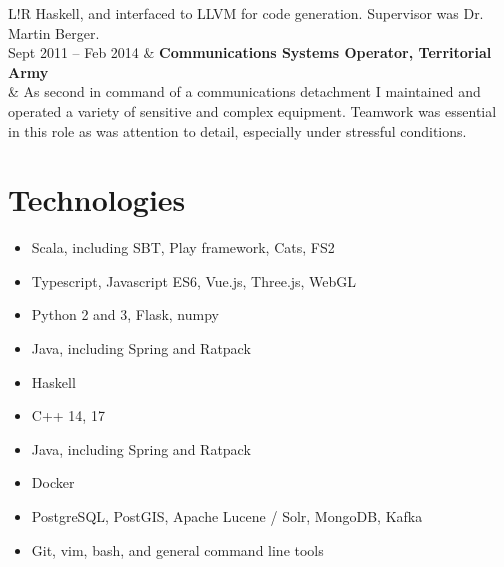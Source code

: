 \documentclass[10pt]{article}
\newcommand\VRule{\color{lightgray}\vrule width 0.5pt}
\begin{document}
\begin{tabular}{L!{\VRule}R}
                        Haskell, and interfaced to LLVM for code generation.
                        Supervisor was Dr. Martin Berger. \\ [5pt]
    Sept 2011 -- Feb 2014 & \textbf{Communications Systems Operator, Territorial Army}\\
                        & As second in command of a communications detachment I
                        maintained and operated a variety of sensitive and complex
                        equipment. Teamwork was essential in this role as was attention
                        to detail, especially under stressful conditions. \\
\end{tabular}

\section*{Technologies}
\begin{multicols}{2}
\begin{itemize}
    \itemsep0em
    \item Scala, including SBT, Play framework, Cats, FS2
    \item Typescript, Javascript ES6, Vue.js, Three.js, WebGL
    \item Python 2 and 3, Flask, numpy
    \item Java, including Spring and Ratpack
    \item Haskell
    \item C++ 14, 17
    \item Java, including Spring and Ratpack
    \item Docker
    \item PostgreSQL, PostGIS, Apache Lucene / Solr, MongoDB, Kafka
    \item Git, vim, bash, and general command line tools
\end{itemize}
\end{multicols}
\end{document}
